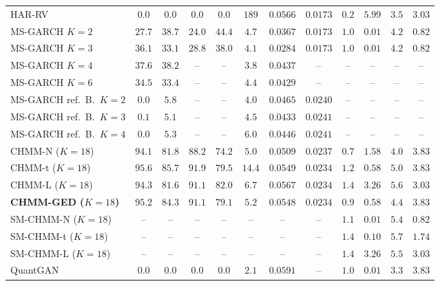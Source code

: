 \begin{table}[t]
{\begin{tabular}{l cc cc c cc cc cc}
HAR-RV              & $0.0$  & $0.0$  & $0.0$  & $0.0$  & $189$  & $0.0566$ & $0.0173$ & $0.2$ & $5.99$ & $3.5$ & $3.03$ \\
MS-GARCH $K = 2$    & $27.7$ & $38.7$ & $24.0$ & $44.4$ & $4.7$  & $0.0367$ & $0.0173$ & $1.0$ & $0.01$ & $4.2$ & $0.82$ \\
MS-GARCH $K = 3$    & $36.1$ & $33.1$ & $28.8$ & $38.0$ & $4.1$  & $\mathbf{0.0284}$ & $0.0173$ & $1.0$ & $0.01$ & $4.2$ & $0.82$ \\
MS-GARCH $K = 4$    & $37.6$ & $38.2$ & --     & --     & $3.8$  & $0.0437$ & --       & --    & --    & --    & --    \\
MS-GARCH $K = 6$    & $34.5$ & $33.4$ & --     & --     & $4.4$  & $0.0429$ & --       & --    & --    & --    & --    \\
MS-GARCH ref.\ B.\ $K = 2$ & $0.0$  & $5.8$  & --     & --     & $4.0$  & $0.0465$ & $0.0240$ & --    & --    & --    & --    \\
MS-GARCH ref.\ B.\ $K = 3$ & $0.1$  & $5.1$  & --     & --     & $4.5$  & $0.0433$ & $0.0241$ & --    & --    & --    & --    \\
MS-GARCH ref.\ B.\ $K = 4$ & $0.0$  & $5.3$  & --     & --     & $6.0$  & $0.0446$ & $0.0241$ & --    & --    & --    & --    \\
\midrule
CHMM-N ($K = 18$)   & $94.1$ & $81.8$ & $88.2$ & $74.2$ & $5.0$  & $0.0509$ & $0.0237$ & $0.7$ & $1.58$ & $4.0$ & $3.83$ \\
CHMM-t ($K = 18$)   & $95.6$ & $\mathbf{85.7}$ & $\mathbf{91.9}$ & $79.5$ & $14.4$ & $0.0549$ & $0.0234$ & $1.2$ & $0.58$ & $5.0$ & $3.83$ \\
CHMM-L ($K = 18$)   & $94.3$ & $81.6$ & $91.1$ & $\mathbf{82.0}$ & $6.7$  & $0.0567$ & $0.0234$ & $1.4$ & $3.26$ & $5.6$ & $3.03$ \\
\textbf{CHMM-GED ($K = 18$)} & $\mathbf{95.2}$ & $84.3$ & $91.1$ & $79.1$ & $5.2$  & $0.0548$ & $0.0234$ & $0.9$ & $0.58$ & $4.4$ & $3.83$ \\
SM-CHMM-N ($K = 18$) & --     & --     & --     & --     & --     & --       & --       & $1.1$ & $0.01$ & $5.4$ & $0.82$ \\
SM-CHMM-t ($K = 18$) & --     & --     & --     & --     & --     & --       & --       & $1.4$ & $0.10$ & $5.7$ & $1.74$ \\
SM-CHMM-L ($K = 18$) & --     & --     & --     & --     & --     & --       & --       & $1.4$ & $3.26$ & $5.5$ & $3.03$ \\
\midrule
QuantGAN            & $0.0$  & $0.0$  & $0.0$  & $0.0$  & $2.1$  & $0.0591$ & --       & $1.0$ & $0.01$ & $3.3$ & $3.83$ \\
\bottomrule
\end{tabular}%
}
\end{table}

